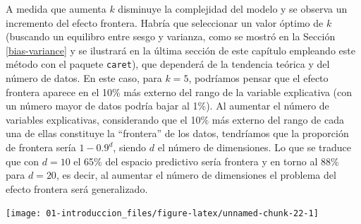 \documentclass[]{book}
\newenvironment{Shaded}{\begin{snugshade}}{\end{snugshade}}
\newcommand{\KeywordTok}[1]{\textcolor[rgb]{0.13,0.29,0.53}{\textbf{#1}}}
\newcommand{\DataTypeTok}[1]{\textcolor[rgb]{0.13,0.29,0.53}{#1}}
\newcommand{\DecValTok}[1]{\textcolor[rgb]{0.00,0.00,0.81}{#1}}
\newcommand{\FloatTok}[1]{\textcolor[rgb]{0.00,0.00,0.81}{#1}}
\newcommand{\StringTok}[1]{\textcolor[rgb]{0.31,0.60,0.02}{#1}}
\newcommand{\OtherTok}[1]{\textcolor[rgb]{0.56,0.35,0.01}{#1}}
\newcommand{\OperatorTok}[1]{\textcolor[rgb]{0.81,0.36,0.00}{\textbf{#1}}}
\newcommand{\NormalTok}[1]{#1}
\theoremstyle{break}
\theoremstyle{definition}
\theoremstyle{definition}
\theoremstyle{definition}
\theoremstyle{remark}
\begin{document}
A medida que aumenta \(k\) disminuye la complejidad del modelo y se
observa un incremento del efecto frontera. Habría que seleccionar un
valor óptimo de \(k\) (buscando un equilibro entre sesgo y varianza,
como se mostró en la Sección \ref{bias-variance} y se ilustrará en la
última sección de este capítulo empleando este método con el paquete
\texttt{caret}), que dependerá de la tendencia teórica y del número de
datos. En este caso, para \(k=5\), podríamos pensar que el efecto
frontera aparece en el 10\% más externo del rango de la variable
explicativa (con un número mayor de datos podría bajar al 1\%). Al
aumentar el número de variables explicativas, considerando que el 10\%
más externo del rango de cada una de ellas constituye la ``frontera'' de
los datos, tendríamos que la proporción de frontera sería \(1-0.9^d\),
siendo \(d\) el número de dimensiones. Lo que se traduce que con
\(d = 10\) el 65\% del espacio predictivo sería frontera y en torno al
88\% para \(d=20\), es decir, al aumentar el número de dimensiones el
problema del efecto frontera será generalizado.

\begin{Shaded}
\end{Shaded}

\begin{center}\texttt{[image: 01-introduccion\_files/figure-latex/unnamed-chunk-22-1]} \end{center}
\end{document}
